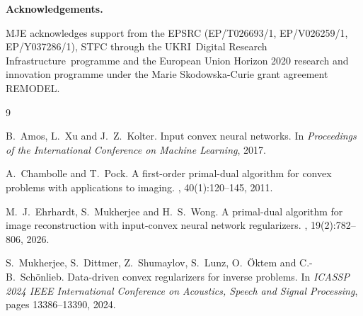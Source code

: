 \documentclass[11pt]{article}
\begin{document}
\vspace{1em}

\noindent
\textbf{Acknowledgements.}

MJE acknowledges support from the EPSRC (EP/T026693/1, EP/V026259/1, EP/Y037286/1), STFC through the UKRI Digital Research Infrastructure programme and the European Union Horizon 2020 research and innovation programme under the Marie Skodowska-Curie grant agreement REMODEL.

\vspace{1em}

\begin{thebibliography}{9}

B.~Amos, L.~Xu and J.~Z.~Kolter.
\newblock Input convex neural networks.
\newblock In {\em Proceedings of the International Conference on Machine Learning},
2017.

A.~Chambolle and T.~Pock.
\newblock A first-order primal-dual algorithm for convex problems with
applications to imaging.
,
40(1):120--145, 2011.

M.~J.~Ehrhardt, S.~Mukherjee and H.~S.~Wong.
\newblock A primal-dual algorithm for image reconstruction with input-convex
neural network regularizers.
,
19(2):782--806, 2026.

S.~Mukherjee, S.~Dittmer, Z.~Shumaylov, S.~Lunz,
O.~\"Oktem and C.-B.~Sch\"onlieb.
\newblock Data-driven convex regularizers for inverse problems.
\newblock In {\em ICASSP 2024 IEEE International Conference on Acoustics,
Speech and Signal Processing}, pages 13386--13390, 2024.

\end{thebibliography}
\end{document}
